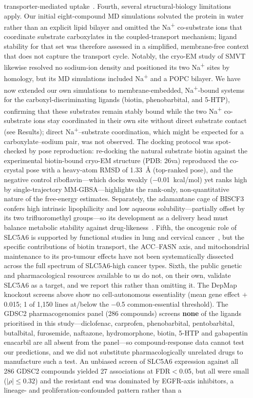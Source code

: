 \documentclass[pdflatex,sn-nature]{sn-jnl}
\begin{document}
transporter-mediated uptake~\cite{hardebo1979,nakatani2008}. Fourth, several structural-biology limitations apply. Our initial eight-compound MD simulations solvated the protein in water rather than an explicit lipid bilayer and omitted the Na\textsuperscript{+} co-substrate ions that coordinate substrate carboxylates in the coupled-transport mechanism; ligand stability for that set was therefore assessed in a simplified, membrane-free context that does not capture the transport cycle. Notably, the cryo-EM study of SMVT~\cite{zhen2026} likewise resolved no sodium-ion density and positioned its two Na\textsuperscript{+} sites by homology, but its MD simulations included Na\textsuperscript{+} and a POPC bilayer. We have now extended our own simulations to membrane-embedded, Na\textsuperscript{+}-bound systems for the carboxyl-discriminating ligands (biotin, phenobarbital, and 5-HTP), confirming that these substrates remain stably bound while the two Na\textsuperscript{+} co-substrate ions stay coordinated in their own site without direct substrate contact (see Results); direct Na\textsuperscript{+}--substrate coordination, which might be expected for a carboxylate--sodium pair, was not observed. The docking protocol was spot-checked by pose reproduction: re-docking the natural substrate biotin against the experimental biotin-bound cryo-EM structure (PDB: 26va) reproduced the co-crystal pose with a heavy-atom RMSD of 1.33~\AA{} (top-ranked pose), and the negative control riboflavin---which docks weakly ($-$0.01~kcal/mol) yet ranks high by single-trajectory MM-GBSA---highlights the rank-only, non-quantitative nature of the free-energy estimates. Separately, the adamantane cage of BISCF3 confers high intrinsic lipophilicity and low aqueous solubility---partially offset by its two trifluoromethyl groups---so its development as a delivery head must balance metabolic stability against drug-likeness~\cite{wanka2013,dane2025}. Fifth, the oncogenic role of SLC5A6 is supported by functional studies in lung and cervical cancer~\cite{zheng2025,wang2026}, but the specific contributions of biotin transport, the ACC--FASN axis, and mitochondrial maintenance to its pro-tumour effects have not been systematically dissected across the full spectrum of SLC5A6-high cancer types. Sixth, the public genetic and pharmacological resources available to us do not, on their own, validate SLC5A6 as a target, and we report this rather than omitting it. The DepMap knockout screens above show no cell-autonomous essentiality (mean gene effect $+$0.015; 1 of 1,150 lines at/below the $-$0.5 common-essential threshold). The GDSC2 pharmacogenomics panel (286 compounds) screens \textbf{none} of the ligands prioritised in this study---diclofenac, carprofen, phenobarbital, pentobarbital, butalbital, furosemide, naftazone, hydromorphone, biotin, 5-HTP and gabapentin enacarbil are all absent from the panel---so compound-response data cannot test our predictions, and we did not substitute pharmacologically unrelated drugs to manufacture such a test. An unbiased screen of SLC5A6 expression against all 286 GDSC2 compounds yielded 27 associations at FDR$<$0.05, but all were small ($|\rho| \le 0.32$) and the resistant end was dominated by EGFR-axis inhibitors, a lineage- and proliferation-confounded pattern rather than a 
\end{document}
